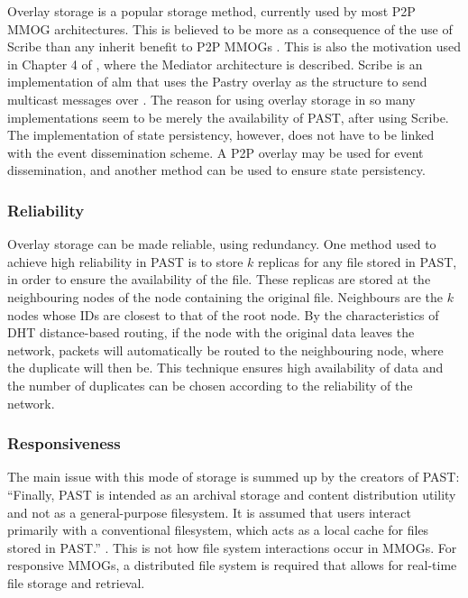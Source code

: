 \documentclass[10pt,a4paper,journal,cspaper,compsoc]{IEEEtran}
\begin{document}

Overlay storage is a popular storage method, currently used by most P2P MMOG architectures. This is believed to be more as a consequence of the use
of Scribe than any inherit benefit to P2P MMOGs \cite{past_storage_focus}. This is also the motivation used in Chapter 4 of \cite{Fan_phd}, where the
Mediator architecture is described. Scribe is an implementation of \ac{alm} that uses the Pastry overlay as the structure to send multicast messages
over \cite{scribe}. The reason for using overlay storage in so many implementations seem to be merely the availability of PAST, after using Scribe.
The implementation of state persistency, however, does not have to be linked with the event dissemination scheme. A P2P overlay may be used for event
dissemination, and another method can be used to ensure state persistency.

\subsubsection{Reliability}
\label{overlay_storage_reliability}

Overlay storage can be made reliable, using redundancy. One method used to achieve high reliability in PAST is to store $k$ replicas for any file
stored in PAST, in order to ensure the availability of the file. These replicas are stored at the neighbouring nodes of the node containing the
original file. Neighbours are the $k$ nodes whose IDs are closest to that of the root node. By the characteristics of \ac{DHT} distance-based
routing, if the node with the original data leaves the network, packets will automatically be routed to the neighbouring node, where the duplicate
will then be. This technique ensures high availability of data and the number of duplicates can be chosen according to the reliability of the
network.


\subsubsection{Responsiveness}
The main issue with this mode of storage is summed up by the creators of PAST: ``Finally, PAST is intended as an archival storage and content
distribution utility and not as a general-purpose filesystem. It is assumed that users interact primarily with a conventional filesystem, which acts
as a local cache for files stored in PAST.'' \cite{storage_and_chaching_PAST}. This is not how file system interactions occur in MMOGs. For
responsive MMOGs, a distributed file system is required that allows for real-time file storage and retrieval.
\end{document}
